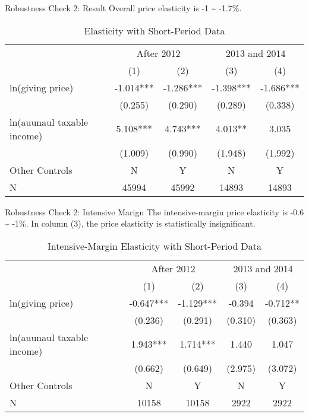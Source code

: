 \documentclass[
  ignorenonframetext,
]{beamer}
\begin{document}
\begin{frame}{Robustness Check 2: Result}
\protect\hypertarget{robustness-check-2-result}{}
Overall price elasticity is -1 \textasciitilde{} -1.7\%.

\begin{table}

\caption{\label{tab:kableShortElasticity1}Elasticity with Short-Period Data}
\centering
\fontsize{8}{10}\selectfont
\begin{tabular}[t]{lcccc}
\toprule
\multicolumn{1}{c}{ } & \multicolumn{2}{c}{After 2012} & \multicolumn{2}{c}{2013 and 2014} \\
\cmidrule(l{3pt}r{3pt}){2-3} \cmidrule(l{3pt}r{3pt}){4-5}
 & (1) & (2) & (3) & (4)\\
\midrule
ln(giving price) & -1.014*** & -1.286*** & -1.398*** & -1.686***\\
 & (0.255) & (0.290) & (0.289) & (0.338)\\
ln(auunaul taxable income) & 5.108*** & 4.743*** & 4.013** & 3.035\\
 & (1.009) & (0.990) & (1.948) & (1.992)\\
Other Controls & N & Y & N & Y\\
N & 45994 & 45992 & 14893 & 14893\\
\bottomrule
\end{tabular}
\end{table}
\end{frame}

\begin{frame}{Robustness Check 2: Intensive Marign}
\protect\hypertarget{robustness-check-2-intensive-marign}{}
The intensive-margin price elasticity is -0.6 \textasciitilde{} -1\%.
In column (3), the price elasticity is statistically insignificant.

\begin{table}

\caption{\label{tab:kableShortElasticity2Slide1}Intensive-Margin Elasticity with Short-Period Data}
\centering
\fontsize{8}{10}\selectfont
\begin{tabular}[t]{lcccc}
\toprule
\multicolumn{1}{c}{ } & \multicolumn{2}{c}{After 2012} & \multicolumn{2}{c}{2013 and 2014} \\
\cmidrule(l{3pt}r{3pt}){2-3} \cmidrule(l{3pt}r{3pt}){4-5}
 & (1) & (2) & (3) & (4)\\
\midrule
ln(giving price) & -0.647*** & -1.129*** & -0.394 & -0.712**\\
 & (0.236) & (0.291) & (0.310) & (0.363)\\
ln(auunaul taxable income) & 1.943*** & 1.714*** & 1.440 & 1.047\\
 & (0.662) & (0.649) & (2.975) & (3.072)\\
Other Controls & N & Y & N & Y\\
N & 10158 & 10158 & 2922 & 2922\\
\bottomrule
\end{tabular}
\end{table}
\end{frame}
\end{document}
